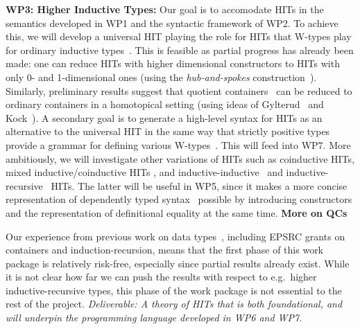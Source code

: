 \documentclass[a4paper,11pt]{article}
\begin{document}
{\bf WP3: Higher Inductive Types:} Our goal is to accomodate HITs in
the semantics developed in WP1 and the syntactic framework of WP2. To
achieve this, we will develop a universal HIT playing the role for
HITs that W-types play for ordinary inductive
types~\cite{alti:icalp04}. This is feasible as partial progress has
already been made: one can reduce HITs with higher dimensional
constructors to HITs with only 0- and 1-dimensional ones (using the
\emph{hub-and-spokes} construction~\cite{hott-book}).
Similarly, preliminary results suggest that quotient
containers~\cite{abottAltenGhaniMcB:quotientContainers} can be reduced
to ordinary containers in a homotopical setting 
(using ideas of Gylterud~\cite{gylterud:thesis} and
Kock~\cite{kock:groupoids}).
%
A secondary goal is to generate a high-level syntax for HITs as
an alternative to the universal HIT in the same way that strictly
positive types provide a grammar for defining various
W-types~\cite{alti:cont-tcs,alti:jcats07}.  This will feed into WP7.
More ambitiously, we will %
investigate other variations of HITs such as coinductive HITs, mixed
inductive/coinductive HITs \cite{txa:mpc2010g}, and
inductive-inductive~\cite{fnf:indind} and
inductive-recursive~\cite{DS:indrec} HITs. The latter will be useful
in WP5, since it makes a more concise representation of dependently
typed syntax~\cite{chapman2009type} possible by introducing
constructors and the representation of definitional equality at the
same time.
{\bf More on QCs}

Our experience from previous work on data
types~\cite{alti:cont-tcs,alti:lics09,txa:cie10,alti:catind2,ghani:fibredIR,gambinoHyland:welfoundedTrees,awodeyGamSoja:indTypesInHTT},
including EPSRC grants on containers and induction-recursion, means
that the first phase of this work package is relatively risk-free,
especially since partial results already exist.
While it is not clear how far we can push the results with respect to
e.g.\ higher inductive-recursive types, this phase of the work package
is not essential to the rest of the project. {\em Deliverable: A
  theory of HITs that is both foundational, and will underpin the
  programming language developed in WP6 and WP7.}
\end{document}
